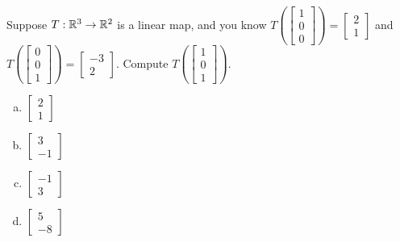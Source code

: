 \begin{activity}{5}
Suppose \(T: \mathbb{R}^3 \rightarrow \mathbb{R}^2\) is a linear map, and you know
\(
  T\left(\begin{bmatrix} 1 \\ 0 \\ 0 \end{bmatrix} \right)
=
  \begin{bmatrix} 2 \\ 1 \end{bmatrix}
\)
and
\(
  T\left(\begin{bmatrix} 0 \\ 0 \\ 1 \end{bmatrix} \right)
=
  \begin{bmatrix} -3 \\ 2 \end{bmatrix}
\).
Compute \(T\left(\begin{bmatrix} 1 \\ 0 \\ 1 \end{bmatrix}\right)\).
\begin{multicols}{2}
\begin{enumerate}[(a)]
\item \(\begin{bmatrix} 2 \\ 1\end{bmatrix}\)
\item \(\begin{bmatrix} 3 \\ -1 \end{bmatrix}\)
\item \(\begin{bmatrix} -1 \\ 3 \end{bmatrix}\)
\item \(\begin{bmatrix} 5 \\ -8 \end{bmatrix}\)
\end{enumerate}
\end{multicols}
\end{activity}

